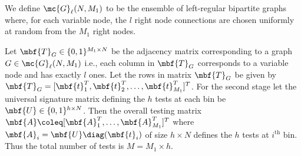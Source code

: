\documentclass[conference,,twocolumn]{IEEEtran}
\begin{document}
\begin{definition}
We define $\mc{G}_{\ell}(N,M_1)$ to be the ensemble of left-regular bipartite graphs where, for each variable node, the $l$ right node connections are chosen uniformly at random from the $M_1$ right nodes.
\end{definition}

 Let $\mbf{T}_{G}\in\{0,1\}^{M_1\times N }$ be the adjacency matrix corresponding to a graph $G\in\mc{G}_{\ell}(N,M_1)$ i.e., each column in $\mbf{T}_{G}$ corresponds to a variable node and has exactly $l$ ones. Let the rows in matrix $\mbf{T}_{G}$ be given by $\mbf{T}_{G}=[\mbf{t}^{T}_1,\mbf{t}^{T}_{2},\dots, \mbf{t}^{T}_{M_1}]^{T}$. For the second stage let the universal signature matrix defining the $h$ tests at each bin be $\mbf{U}\in\{0,1\}^{h\times N}$. Then the overall testing matrix $\mbf{A}\coleq [\mbf{A}_{1}^{T},\ldots,\mbf{A}_{M_{1}}^{T}]^T$ where $\mbf{A}_{i}=\mbf{U} \diag (\mbf{t}_i)$ of size $h\times N$ defines the $h$ tests at $i^{\text{th}}$ bin. Thus the total number of tests is $M=M_1\times h$.

 
\end{document}

